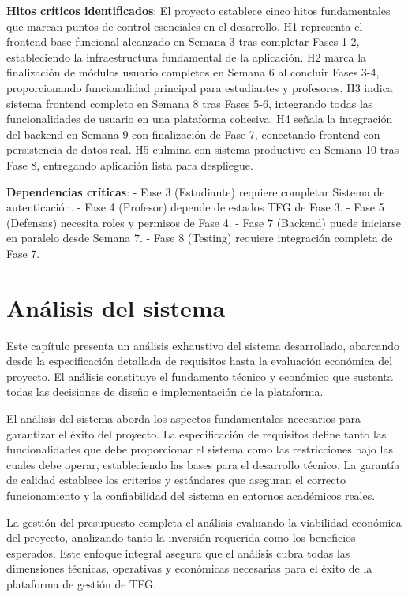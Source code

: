 \documentclass[12pt,a4paper,oneside]{report}
\begin{document}
\textbf{Hitos críticos identificados}: El proyecto establece cinco hitos fundamentales que marcan puntos de control esenciales en el desarrollo. H1 representa el frontend base funcional alcanzado en Semana 3 tras completar Fases 1-2, estableciendo la infraestructura fundamental de la aplicación. H2 marca la finalización de módulos usuario completos en Semana 6 al concluir Fases 3-4, proporcionando funcionalidad principal para estudiantes y profesores. H3 indica sistema frontend completo en Semana 8 tras Fases 5-6, integrando todas las funcionalidades de usuario en una plataforma cohesiva. H4 señala la integración del backend en Semana 9 con finalización de Fase 7, conectando frontend con persistencia de datos real. H5 culmina con sistema productivo en Semana 10 tras Fase 8, entregando aplicación lista para despliegue.

\textbf{Dependencias críticas}: - Fase 3 (Estudiante) requiere completar
Sistema de autenticación. - Fase 4 (Profesor) depende de estados TFG de
Fase 3. - Fase 5 (Defensas) necesita roles y permisos de Fase 4. - Fase
7 (Backend) puede iniciarse en paralelo desde Semana 7. - Fase 8
(Testing) requiere integración completa de Fase 7.

\chapter{Análisis del sistema}\label{anuxe1lisis-del-sistema}
Este capítulo presenta un análisis exhaustivo del sistema desarrollado, abarcando desde la especificación detallada de requisitos hasta la evaluación económica del proyecto. El análisis constituye el fundamento técnico y económico que sustenta todas las decisiones de diseño e implementación de la plataforma.

El análisis del sistema aborda los aspectos fundamentales necesarios para garantizar el éxito del proyecto. La especificación de requisitos define tanto las funcionalidades que debe proporcionar el sistema como las restricciones bajo las cuales debe operar, estableciendo las bases para el desarrollo técnico. La garantía de calidad establece los criterios y estándares que aseguran el correcto funcionamiento y la confiabilidad del sistema en entornos académicos reales.

La gestión del presupuesto completa el análisis evaluando la viabilidad económica del proyecto, analizando tanto la inversión requerida como los beneficios esperados. Este enfoque integral asegura que el análisis cubra todas las dimensiones técnicas, operativas y económicas necesarias para el éxito de la plataforma de gestión de TFG.
\end{document}
